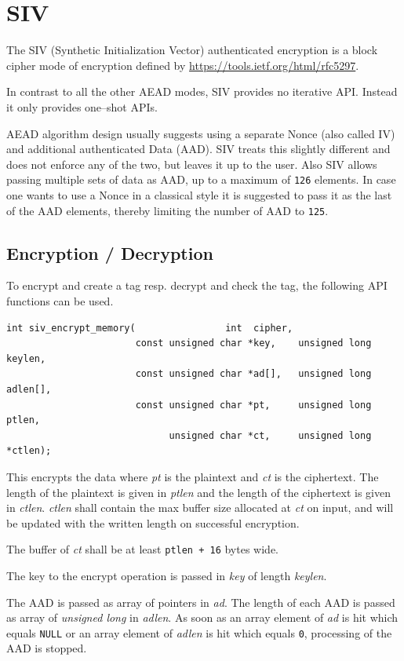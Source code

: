 \documentclass[synpaper]{book}
\newcommand{\mysection}[1]    %
	{                   %
	\section{#1}
   \markboth{\textsf{www.libtom.net}}{\thesection ~ {#1}}
	}
\begin{document}
\mysection{SIV}
\label{SIV}

The SIV (Synthetic Initialization Vector) authenticated encryption is a block cipher mode of encryption
defined by \url{https://tools.ietf.org/html/rfc5297}.

In contrast to all the other AEAD modes, SIV provides no iterative API. Instead it only provides one--shot APIs.

AEAD algorithm design usually suggests using a separate Nonce (also called IV) and additional authenticated Data (AAD).
SIV treats this slightly different and does not enforce any of the two, but leaves it up to the user.
Also SIV allows passing multiple sets of data as AAD, up to a maximum of \texttt{126} elements.
In case one wants to use a Nonce in a classical style it is suggested to pass it as the last of the AAD elements,
thereby limiting the number of AAD to \texttt{125}.

\subsection{Encryption / Decryption}
To encrypt and create a tag resp. decrypt and check the tag, the following API functions can be used.

\begin{verbatim}
int siv_encrypt_memory(                int  cipher,
                       const unsigned char *key,    unsigned long  keylen,
                       const unsigned char *ad[],   unsigned long  adlen[],
                       const unsigned char *pt,     unsigned long  ptlen,
                             unsigned char *ct,     unsigned long *ctlen);
\end{verbatim}
This encrypts the data where \textit{pt} is the plaintext and \textit{ct} is the ciphertext.
The length of the plaintext is given in \textit{ptlen} and the length of the ciphertext is given in \textit{ctlen}.
\textit{ctlen} shall contain the max buffer size allocated at \textit{ct} on input, and will be updated with the
written length on successful encryption.

The buffer of \textit{ct} shall be at least \texttt{ptlen + 16} bytes wide.

The key to the encrypt operation is passed in \textit{key} of length  \textit{keylen}.

The AAD is passed as array of pointers in \textit{ad}. The length of each AAD is passed as array of
\textit{unsigned long} in \textit{adlen}.
As soon as an array element of \textit{ad} is hit which equals \texttt{NULL} or an array element of \textit{adlen}
is hit which equals \texttt{0}, processing of the AAD is stopped.
\end{document}
